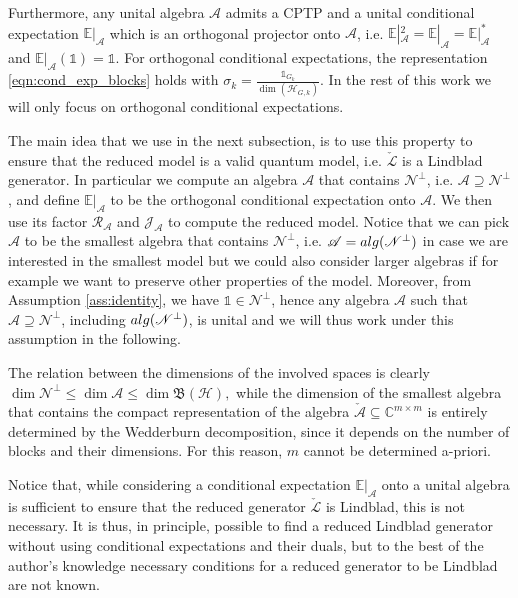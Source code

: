\documentclass[aihp,12pt]{imsart}
\newcommand{\Hc}{\mathcal{H}}
\newcommand{\Jc}{\mathcal{J}}
\newcommand{\Rc}{\mathcal{R}}
\newcommand{\Lc}{\mathcal{L}}
\newcommand{\As}{\mathscr{A}}
\newcommand{\Ns}{\mathscr{N}}
\newcommand{\Cb}{\mathbb{C}}
\newcommand{\Bf}{\mathfrak{B}}
\newcommand{\CE}{\mathbb{E}|}
\newcommand{\one}{\mathbb{1}}
\newcommand{\alg}{{\rm alg}}
\theoremstyle{theorem}
\theoremstyle{definition}
\theoremstyle{remark}
\begin{document}
Furthermore, any unital algebra $\As$ admits a CPTP and a unital conditional expectation $\CE_\As$ which is an orthogonal projector onto $\As$, i.e. $\CE_\As^2 = \CE_\As = \CE_\As^*$ and $\CE_\As(\one) = \one$. For orthogonal conditional expectations, the representation \eqref{eqn:cond_exp_blocks} holds with $\sigma_k = \frac{\one_{G_k}}{\dim(\Hc_{G,k})}$. In the rest of this work we will only focus on orthogonal conditional expectations.

The main idea that we use in the next subsection, is to use this property to ensure that the reduced model is a valid quantum model, i.e. $\check{\Lc}$ is a Lindblad generator. In particular we compute an algebra $\As$ that contains $\Ns^\perp$, i.e. $\As\supseteq\Ns^\perp$, and define $\CE_\As$ to be the orthogonal conditional expectation onto $\As$. We then use its factor $\Rc_{\As}$ and $\Jc_{\As}$ to compute the reduced model. Notice that we can pick $\As$ to be the smallest algebra that contains $\Ns^\perp$, i.e. $\As=\alg(\Ns^\perp)$ in case we are interested in the smallest model but we could also consider larger algebras if for example we want to preserve other properties of the model. 
Moreover, from Assumption \ref{ass:identity}, we have $\one\in\Ns^\perp$, hence any algebra $\As$ such that $\As\supseteq \Ns^\perp$, including $\alg(\Ns^\perp)$, is unital and we will thus work under this assumption in the following.

The relation between the dimensions of the involved spaces is clearly $\dim\Ns^\perp\leq\dim\As\leq\dim\Bf(\Hc),$ while the dimension of the smallest algebra that contains the compact representation of the algebra $\check{\As}\subseteq \Cb^{m\times m}$ is entirely determined by the Wedderburn decomposition, since it depends on the number of blocks and their dimensions. For this reason, $m$ cannot be determined a-priori.

Notice that, while considering a conditional expectation $\CE_\As$ onto a unital algebra is sufficient to ensure that the reduced generator $\check{\Lc}$ is Lindblad, this is not necessary. It is thus, in principle, possible to find a reduced Lindblad generator without using conditional expectations and their duals, but to the best of the author's knowledge necessary conditions for a reduced generator to be Lindblad are not known. 
\end{document}
